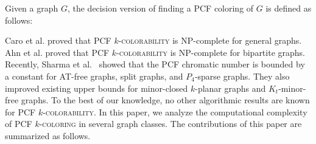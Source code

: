 \documentclass[11pt]{article}
\theoremstyle{plain}
\begin{document}
	
	\medskip
	
	Given a graph $G$, the decision version of finding a PCF coloring of $G$ is defined as follows:
	
	\begin{center}
	\end{center}
	
	
	Caro et al. \cite{CPS} proved that \textsc{PCF $k$-colorability} is NP-complete for general graphs. 
	Ahn et al. \cite{AIO} proved that PCF $k$-\textsc{colorability} is NP-complete for bipartite graphs. Recently, Sharma et al.~\cite{SPP} showed that the PCF chromatic number is bounded by a constant for AT-free graphs, split graphs, and $P_4$-sparse graphs. They also improved existing upper bounds for minor-closed $k$-planar graphs and $K_t$-minor-free graphs.
	To the best of our knowledge, no other algorithmic results are known for PCF $k$-\textsc{colorability}. 
	In this paper, we analyze the computational complexity of \textsc{PCF $k$-coloring} in several graph classes. The contributions of this paper are summarized as follows.
	
\end{document}
